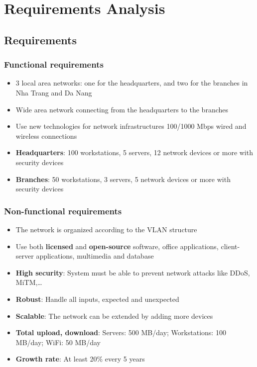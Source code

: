 \section{Requirements Analysis}
\subsection{Requirements}
\subsubsection{Functional requirements}
\begin{itemize}
  \item 3 local area networks: one for the headquarters, and two for the branches in Nha Trang and Da Nang
  \item Wide area network connecting from the headquarters to the branches
  \item Use new technologies for network infrastructures 100/1000 Mbps wired and wireless connections
  \item \textbf{Headquarters}: 100 workstations, 5 servers, 12 network devices or more with security devices
  \item \textbf{Branches}: 50 workstations, 3 servers, 5 network devices or more with security devices
\end{itemize}

\subsubsection{Non-functional requirements}
\begin{itemize}
  \item The network is organized according to the VLAN structure
  \item Use both \textbf{licensed} and \textbf{open-source} software, office applications, client-server applications, multimedia and database
  \item \textbf{High security}: System must be able to prevent network attacks like DDoS, MiTM,\dots
  \item \textbf{Robust}: Handle all inputs, expected and unexpected
  \item \textbf{Scalable}: The network can be extended by adding more devices
  \item \textbf{Total upload, download}: Servers: 500 MB/day; Workstations: 100 MB/day; WiFi: 50 MB/day
  \item \textbf{Growth rate}: At least 20\% every 5 years
\end{itemize}

